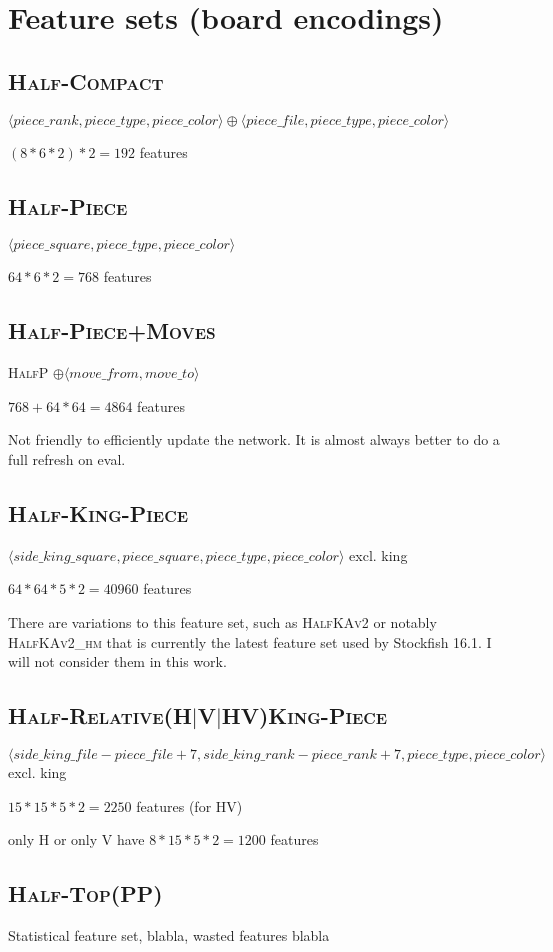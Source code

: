 \newcommand{\fs}[1]{\textsc{#1}}

\section{Feature sets (board encodings)}

\subsection{\mdseries\fs{Half-Compact}}

$\langle piece\_rank, piece\_type, piece\_color \rangle \oplus \langle piece\_file, piece\_type, piece\_color \rangle$

$(8*6*2)*2=192$ features

\subsection{\mdseries\fs{Half-Piece}}

$\langle piece\_square, piece\_type, piece\_color \rangle$

$64*6*2=768$ features

\subsection{\mdseries\fs{Half-Piece+Moves}}

\fs{HalfP} $\oplus \langle move\_from, move\_to \rangle$

$768 + 64*64=4864$ features

Not friendly to efficiently update the network. It is almost always better to do a full refresh on eval.

\subsection{\mdseries\fs{Half-King-Piece}}

$\langle side\_king\_square, piece\_square, piece\_type, piece\_color \rangle$ excl. king

$64*64*5*2=40960$ features

There are variations to this feature set, such as \fs{HalfKAv2} or notably \fs{HalfKAv2\_hm} that is currently the latest feature set used by Stockfish 16.1. I will not consider them in this work.

\subsection{\mdseries\fs{Half-Relative(H$|$V$|$HV)King-Piece}}


$\langle side\_king\_file - piece\_file + 7, side\_king\_rank - piece\_rank + 7, piece\_type, piece\_color \rangle$ excl. king

$15*15*5*2=2250$ features (for HV)

only H or only V have $8*15*5*2=1200$ features


\subsection{\mdseries\fs{Half-Top(PP)}}

Statistical feature set, blabla, wasted features blabla

